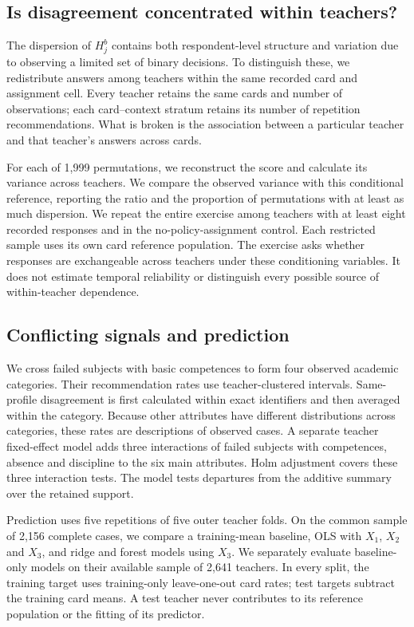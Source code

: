 \begin{addition}
\subsection{Is disagreement concentrated within teachers?}
The dispersion of $H^b_j$ contains both respondent-level structure and variation due to observing a limited set of binary decisions. To distinguish these, we redistribute answers among teachers within the same recorded card and assignment cell. Every teacher retains the same cards and number of observations; each card--context stratum retains its number of repetition recommendations. What is broken is the association between a particular teacher and that teacher's answers across cards.

For each of 1,999 permutations, we reconstruct the score and calculate its variance across teachers. We compare the observed variance with this conditional reference, reporting the ratio and the proportion of permutations with at least as much dispersion. We repeat the entire exercise among teachers with at least eight recorded responses and in the no-policy-assignment control. Each restricted sample uses its own card reference population. The exercise asks whether responses are exchangeable across teachers under these conditioning variables. It does not estimate temporal reliability or distinguish every possible source of within-teacher dependence.

\subsection{Conflicting signals and prediction}
We cross failed subjects with basic competences to form four observed academic categories. Their recommendation rates use teacher-clustered intervals. Same-profile disagreement is first calculated within exact identifiers and then averaged within the category. Because other attributes have different distributions across categories, these rates are descriptions of observed cases. A separate teacher fixed-effect model adds three interactions of failed subjects with competences, absence and discipline to the six main attributes. Holm adjustment covers these three interaction tests. The model tests departures from the additive summary over the retained support.

Prediction uses five repetitions of five outer teacher folds. On the common sample of 2,156 complete cases, we compare a training-mean baseline, OLS with $X_1$, $X_2$ and $X_3$, and ridge and forest models using $X_3$. We separately evaluate baseline-only models on their available sample of 2,641 teachers. In every split, the training target uses training-only leave-one-out card rates; test targets subtract the training card means. A test teacher never contributes to its reference population or the fitting of its predictor.


\end{addition}
